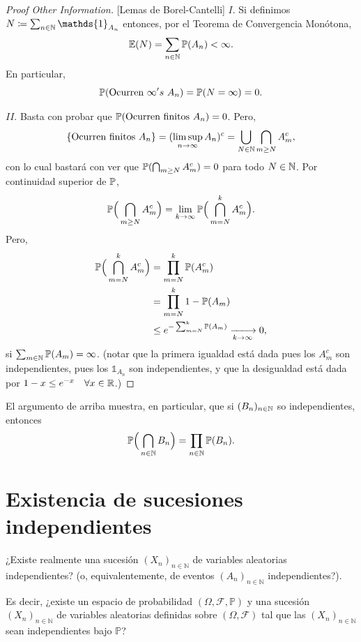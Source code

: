 \begin{proof}[Proof Other Information][Lemas de Borel-Cantelli]
	$\boxed{I.}$ Si definimos $N \coloneq \sum_{n \in \N} \mathds{1}_{A_{n}}$ entonces, por el Teorema de Convergencia Monótona,
	\[ \mathbb{E}(N) = \sum_{n \in \mathbb{N}} \mathbb{P}(A_{n}) < \infty. \]
	En particular,
	\[ \mathbb{P}(\text{Ocurren } \infty's \ A_{n}) = \mathbb{P}(N = \infty) = 0. \]
	\par $\boxed{II.}$ Basta con probar que $\mathbb{P}(\text{Ocurren finitos } A_{n}) = 0$. Pero,
	\[ \{\text{Ocurren finitos } A_{n}\} = (\limsup_{n \to \infty} A_{n})^{c} = \bigcup_{N \in \mathbb{N}} \bigcap_{m \geq N} A_{m}^{c}, \]
	con lo cual bastará con ver que $\mathbb{P}(\bigcap_{m \geq N} A_{m}^{c}) = 0$ para todo $N \in \mathbb{N}$. Por continuidad superior de $\mathbb{P}$,
	\[ \mathbb{P} \Big( \bigcap_{m \geq N} A_{m}^{c} \Big) = \lim_{k \to \infty} \mathbb{P} \Big( \bigcap_{m = N}^{k} A_{m}^{c} \Big). \]
	Pero,
	\begin{align*}
		\mbb{P} \Big( \bigcap_{m = N}^{k} A_{m}^{c} \Big) &= \prod_{m = N}^{k} \mbb{P}(A_{m}^{c}) \\
		&= \prod_{m = N}^{k} 1 - \mbb{P}(A_{m}) \\
		&\leq e^{-\sum_{m=N}^{k} \mbb{P}(A_{m})} \xlongrightarrow[k \to \infty]{} 0
	,\end{align*}
	si $\sum_{m \in \mathbb{N}} \mathbb{P}(A_{m}) = \infty$. (notar que la primera igualdad está dada pues los $A_{m}^{c}$ son independientes, pues los $\mathds{1}_{A_{n}}$ son independientes, y que la desigualdad está dada por $1 - x \leq e^{-x} \quad \forall x \in \mathbb{R}$.)
\end{proof}

\begin{remark}
	El argumento de arriba muestra, en particular, que si $(B_{n})_{n \in \mathbb{N}}$ so independientes, entonces
	\[ \mathbb{P} \Big( \bigcap_{n \in \mathbb{N}} B_{n} \Big) = \prod_{n \in \mathbb{N}} \mathbb{P}(B_{n}). \]
\end{remark}

\section{Existencia de sucesiones independientes}

¿Existe realmente una sucesión \((X_n)_{n\in\mathbb{N}}\) de variables aleatorias independientes? (o, equivalentemente, de eventos \((A_n)_{n\in\mathbb{N}}\) independientes?). \par
Es decir, ¿existe un espacio de probabilidad \((\Omega, \mathcal{F}, \mathbb{P})\) y una sucesión \((X_n)_{n\in\mathbb{N}}\) de variables aleatorias definidas sobre \((\Omega, \mathcal{F})\) tal que las \((X_n)_{n\in\mathbb{N}}\) sean independientes bajo \(\mathbb{P}\)?

